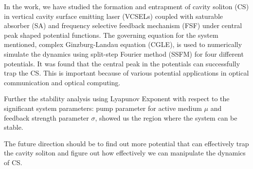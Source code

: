 
In the work, we have studied the formation and entrapment of cavity soliton (CS) 
in vertical cavity surface emitting laser (VCSELs) coupled with saturable absorber (SA)
and frequency selective feedback mechanism (FSF) under central peak shaped potential functions. 
The governing equation for the system mentioned, complex Ginzburg-Landau equation (CGLE), is 
used to numerically simulate the dynamics using split-step Fourier method (SSFM) for four different 
potentials. It was found that the central peak in the potentials can successfully trap the CS. 
This is important because of various potential applications in optical communication and optical 
computing. 

Further the stability analysis using Lyapunov Exponent with respect to the significant 
system parameters: pump parameter for active medium $\mu$ and feedback strength parameter 
$\sigma$, showed us the region where the system can be stable. 

The future direction should be to find out more potential that can effectively trap the 
cavity soliton and figure out how effectively we can manipulate the dynamics of CS.
